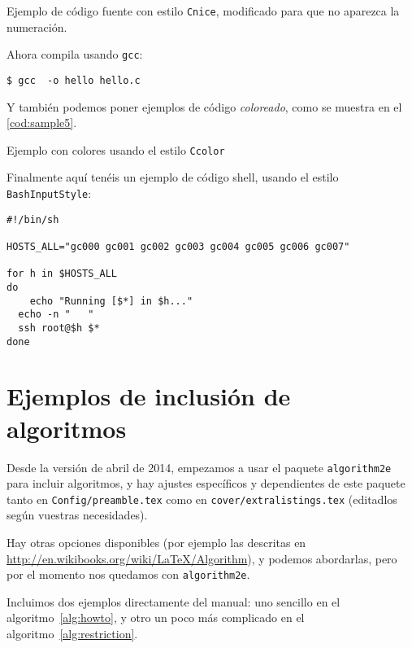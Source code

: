 \begin{codefloat}

\caption{Ejemplo de código fuente con estilo \texttt{Cnice}, modificado
para que no aparezca la numeración.}
\label{cod:sample3}
\end{codefloat}


\noindent
Ahora compila usando \texttt{gcc}:


\begin{lstlisting}[style=console, numbers=none]
$ gcc  -o hello hello.c
\end{lstlisting}

Y también podemos poner ejemplos de código \textit{coloreado}, como se
muestra en el \ref{cod:sample5}.

\begin{codefloat}

\caption{Ejemplo con colores usando el estilo \texttt{Ccolor}}
\label{cod:sample5}
\end{codefloat}

Finalmente aquí tenéis un ejemplo de código shell, usando el estilo
\texttt{BashInputStyle}:

\begin{lstlisting}[style=BashInputStyle, numbers=none]
#!/bin/sh

HOSTS_ALL="gc000 gc001 gc002 gc003 gc004 gc005 gc006 gc007"

for h in $HOSTS_ALL
do
	echo "Running [$*] in $h..."
  echo -n "   "
  ssh root@$h $*
done
\end{lstlisting}


\section{Ejemplos de inclusión de algoritmos}
\label{sec:algoritmos}

Desde la versión de abril de 2014, empezamos a usar el paquete
\texttt{algorithm2e} para incluir algoritmos, y hay ajustes específicos
y dependientes de este paquete tanto en \texttt{Config/preamble.tex}
como en \texttt{cover/extralistings.tex} (editadlos según vuestras
necesidades). 

Hay otras opciones disponibles (por ejemplo las descritas en
\url{http://en.wikibooks.org/wiki/LaTeX/Algorithm}), y podemos
abordarlas, pero por el momento nos quedamos con \texttt{algorithm2e}.

Incluimos dos ejemplos directamente del manual: uno sencillo en el
algoritmo~\ref{alg:howto}, y otro un poco más complicado en el
algoritmo~\ref{alg:restriction}.

